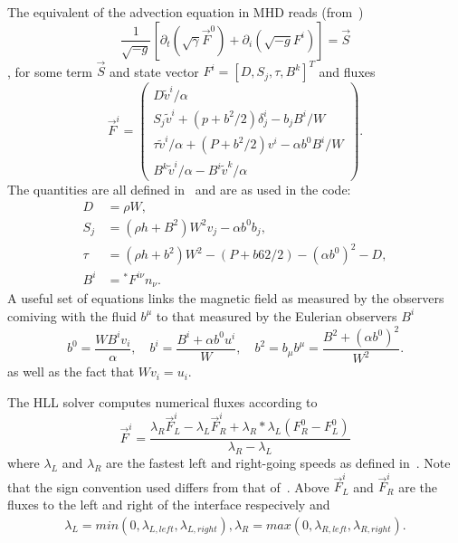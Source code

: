 The equivalent of the advection equation in MHD reads (from~\cite{whiskymhd})
\begin{equation}
    \frac{1}{\sqrt{-g}} \left[ \partial_t (\sqrt{\gamma} \vec F^0) +
    \partial_i (\sqrt{-g} F^i)\right] = \vec S
\end{equation},
for some term $\vec S$ and state vector $F^i = [D, S_j, \tau, B^k]^T$ and
fluxes
\begin{equation}
    \vec F^i = \left( \begin{gathered}
        D \tilde v^i / \alpha \\
        S_j \tilde v^i + (p + b^2/2) \delta^i_j - b_j B^i/W \\
        \tau \tilde v^i / \alpha + (P + b^2/2) v^i - \alpha b^0 B^i / W \\
        B^k \tilde v^i / \alpha - B^i \tilde v^k / \alpha
    \end{gathered} \right).
\end{equation}
The quantities are all defined in~\cite{whiskymhd} and are as used in the
code:
\begin{align}
    D &= \rho W, \\
    S_j &= (\rho h + B^2 ) W^2 v_j - \alpha b^0 b_j, \\
    \tau &= (\rho h + b^2) W^2 - (P+b62/2) - (\alpha b^0)^2 - D, \\
    B^i &= {}^*F^{i \nu} n_\nu.
\end{align}
A useful set of equations links the magnetic field as measured by the
observers comiving with the fluid $b^\mu$ to that measured by the Eulerian
observers $B^i$
\begin{equation}
    b^0 = \frac{W B^i v_i}{\alpha}, \quad b^i = \frac{B^i + \alpha b^0
    u^i}{W}, \quad b^2 = b_\mu b^\mu = \frac{B^2 + (\alpha b^0)^2}{W^2}.
\end{equation}
as well as the fact that $W v_i = u_i$.

The HLL solver computes numerical fluxes according to 
\begin{equation}
    \vec F^i = \frac{\lambda_R \vec F^i_L - \lambda_L \vec F^i_R +
    \lambda_R*\lambda_L (F^0_R-F^0_L)}{\lambda_R - \lambda_L}
\end{equation}
where $\lambda_L$ and $\lambda_R$ are the fastest left and right-going speeds
as defined in~\cite{echo}. Note that the sign convention used differs from
that of~\cite{whiskymhd}. Above $\vec F^i_L$ and $\vec F^i_R$ are the fluxes
to the left and right of the interface respecively and 
\begin{eqnarray}
    \lambda_L = min(0,\lambda_{L,left}, \lambda_{L,right}),
    \lambda_R = max(0,\lambda_{R,left}, \lambda_{R,right}).
\end{eqnarray}

